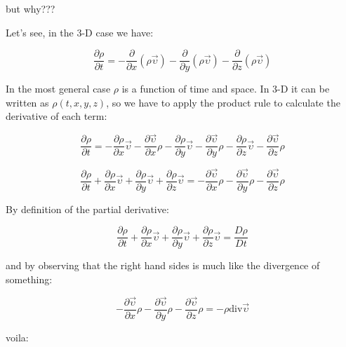 \documentclass[12pt]{report}
\begin{document}
but why???

Let's see, in the 3-D case we have:

\begin{equation}
\frac{\partial \rho}{\partial t} = - \frac{\partial}{\partial x} (\rho \vec{\upsilon}) - \frac{\partial}{\partial y} (\rho \vec{\upsilon}) - \frac{\partial}{\partial z} (\rho \vec{\upsilon})
\end{equation}

In the most general case $\rho$ is a function of time and space. In 3-D it can be written as $\rho(t, x, y, z)$, so we have to apply the product rule to calculate the derivative of each term:

\begin{equation}
\frac{\partial \rho}{\partial t} = - \frac{\partial \rho}{\partial x} \vec{\upsilon} - \frac{\partial \vec{\upsilon}}{\partial x} \rho - \frac{\partial \rho}{\partial y} \vec{\upsilon} - \frac{\partial \vec{\upsilon}}{\partial y} \rho - \frac{\partial \rho}{\partial z} \vec{\upsilon} - \frac{\partial \vec{\upsilon}}{\partial z} \rho 
\end{equation}

\begin{equation}
\frac{\partial \rho}{\partial t} + \frac{\partial \rho}{\partial x} \vec{\upsilon} + \frac{\partial \rho}{\partial y} \vec{\upsilon} + \frac{\partial \rho}{\partial z} \vec{\upsilon} =  - \frac{\partial \vec{\upsilon}}{\partial x} \rho - \frac{\partial \vec{\upsilon}}{\partial y} \rho - \frac{\partial \vec{\upsilon}}{\partial z} \rho
\end{equation}

By definition of the partial derivative:

\begin{equation}
\frac{\partial \rho}{\partial t} + \frac{\partial \rho}{\partial x} \vec{\upsilon} + \frac{\partial \rho}{\partial y} \vec{\upsilon} + \frac{\partial \rho}{\partial z} \vec{\upsilon} = \frac{D \rho}{D t}
\end{equation}

and by observing that the right hand sides is much like the divergence of something:

\begin{equation}
- \frac{\partial \vec{\upsilon}}{\partial x} \rho - \frac{\partial \vec{\upsilon}}{\partial y} \rho - \frac{\partial \vec{\upsilon}}{\partial z} \rho = - \rho \text{div} \vec{\upsilon}
\end{equation}

voila:
\end{document}
